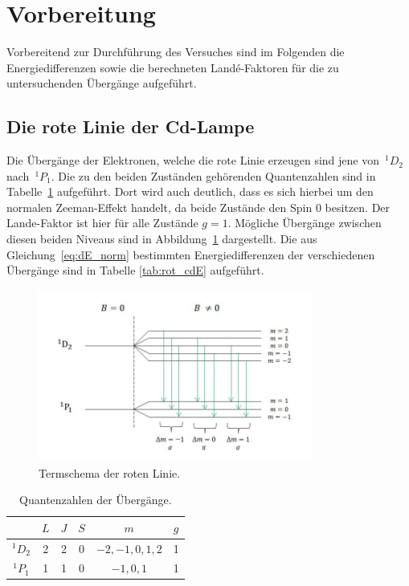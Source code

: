 \section{Vorbereitung}
\label{sec:vorbereitung}
Vorbereitend zur Durchführung des Versuches sind im Folgenden die Energiedifferenzen
sowie die berechneten Landé-Faktoren für die zu untersuchenden Übergänge aufgeführt.

\subsection{Die rote Linie der Cd-Lampe}
Die Übergänge der Elektronen, welche die rote Linie erzeugen sind jene von~$^{1}D_2$
nach~$^{1}P_1$. Die zu den beiden Zuständen gehörenden Quantenzahlen sind in
Tabelle~\ref{tab:rot_cd} aufgeführt. Dort wird auch deutlich, dass es sich hierbei
um den normalen Zeeman-Effekt handelt, da beide Zustände den Spin $0$ besitzen. Der
Lande-Faktor ist hier für alle Zustände $g=1$. Mögliche Übergänge zwischen diesen
beiden Niveaus sind in Abbildung~\ref{fig:therm_rot} dargestellt. Die aus
Gleichung~\eqref{eq:dE_norm} bestimmten Energiedifferenzen der verschiedenen
Übergänge sind in Tabelle \ref{tab:rot_cdE} aufgeführt.

\begin{figure}
    \centering
    \includegraphics[width=0.8\textwidth]{graphics/termschema_rot.jpg}
    \caption{Termschema der roten Linie.}
    \label{fig:therm_rot}
\end{figure}

\begin{table}[H]
    \centering
    \caption{Quantenzahlen der Übergänge.}
    \begin{tabular}{cccccc}
        \toprule
    {} & {$L$}  & {$J$}  & {$S$} & {$m$} & {$g$} \\
		\midrule
	  $^{1}D_2$ & 2 & 2 & 0 & $-2,-1,0,1,2$ & 1 \\
    $^{1}P_1$ & 1 & 1 & 0 & $-1,0,1$ & 1 \\
    \bottomrule
	\end{tabular}
    \label{tab:rot_cd}
\end{table}

